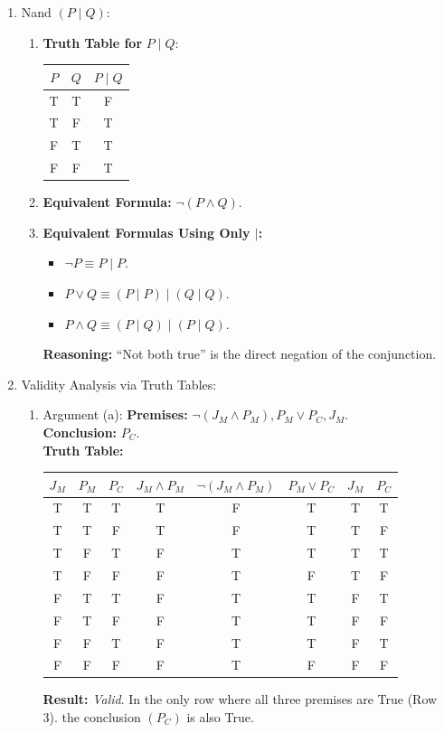 \begin{enumerate}
\item Nand $(P \mid Q)$:
  \begin{enumerate}
  \item \textbf{Truth Table for} $P \mid Q$:
    \begin{center}
      \begin{tabular}{ccc}
        $P$ & $Q$ & $P \mid Q$ \\
        \midrule
        T & T & F \\
        T & F & T \\
        F & T & T \\
        F & F & T 
      \end{tabular}
    \end{center}

  \item \textbf{Equivalent Formula:} $\neg (P \land Q)$.
    
  \item \textbf{Equivalent Formulas Using Only $\mid$:}
    \begin{itemize}
    \item $\neg P \equiv P \mid P$.
    \item $P \lor Q \equiv (P \mid P) \mid (Q \mid Q)$.
    \item $P \land Q \equiv (P \mid Q) \mid (P \mid Q)$.
    \end{itemize}
    \textbf{Reasoning:} ``Not both true'' is the direct negation of the conjunction.
  \end{enumerate}

\item Validity Analysis via Truth Tables:
  \begin{enumerate}
  \item Argument (a):
    \textbf{Premises:} $\neg (J_M \land P_M), P_M \lor P_C, J_M$. \\
    \textbf{Conclusion:} $P_C$. \\
    \textbf{Truth Table:}
    \begin{center}
      \begin{tabular}{cccccccc}
        $J_M$ & $P_M$ & $P_C$ & $J_M \land P_M$ & $\neg (J_M \land P_M)$ & $P_M \lor P_C$ & $J_M$ & $P_C$ \\
        \midrule
        T & T & T & T & F & T & T & T \\
        T & T & F & T & F & T & T & F \\
        T & F & T & F & T & T & T & T \\
        T & F & F & F & T & F & T & F \\ 
        F & T & T & F & T & T & F & T \\
        F & T & F & F & T & T & F & F \\
        F & F & T & F & T & T & F & T \\
        F & F & F & F & T & F & F & F
      \end{tabular}
    \end{center}
    \textbf{Result:} \emph{Valid}. In the only row where all three premises are True (Row 3). the conclusion $(P_C)$ is also True.


\end{enumerate}
\end{enumerate}

